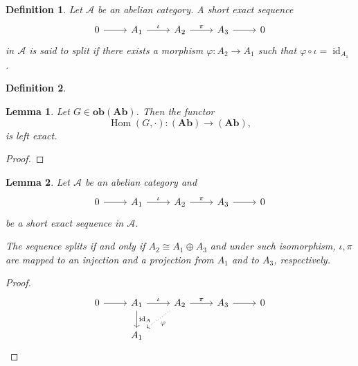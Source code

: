 \documentclass{article}
\newtheorem{definition}{Definition}[section]
\newtheorem{lemma}{Lemma}[section]
\numberwithin{equation}{section}
\DeclareMathOperator{\Hom}{Hom}
\DeclareMathOperator{\id}{id}
\begin{document}
\begin{definition}
Let $\mathscr{A}$ be an abelian category. A short exact sequence
\[
\begin{tikzcd}
0 \arrow[r] & A_1 \arrow[r,"\iota"] & A_2 \arrow[r,"\pi"] & A_3 \arrow[r] & 0
\end{tikzcd}
\]
in $\mathscr{A}$ is said to split if there exists a morphism $\varphi:A_2\to A_1$ such that $\varphi\circ\iota = \id_{A_1}$. 
\end{definition}

\begin{definition}
\end{definition}

\begin{lemma}
Let $G\in\mathbf{ob}(\mathbf{Ab})$. Then the functor
\begin{equation*}
\Hom(G,\cdot):(\mathbf{Ab})\to(\mathbf{Ab}),
\end{equation*}
is left exact.
\end{lemma}

\begin{proof}
\end{proof}

\begin{lemma}
Let $\mathscr{A}$ be an abelian category and
\[
\begin{tikzcd}
0 \arrow[r] & A_1 \arrow[r,"\iota"] & A_2 \arrow[r,"\pi"] & A_3 \arrow[r] & 0
\end{tikzcd}
\]
be a short exact sequence in $\mathscr{A}$.\\
\par The sequence splits if and only if $A_2\cong A_1\oplus A_3$ and under such isomorphism, $\iota,\pi$ are mapped to an injection and a projection from $A_1$ and to $A_3$, respectively. 
\end{lemma}

\begin{proof}
\[
\begin{tikzcd}
0 \arrow[r] & A_1 \arrow[d, "\id_A"] \arrow[r, "\iota"] & A_2 \arrow[r, "\pi"] \arrow[ld, "\varphi", dotted] & A_3 \arrow[r] & 0 \\
            & A_1                                       &                                                    &               &  
\end{tikzcd}
\]
\end{proof}
\end{document}
